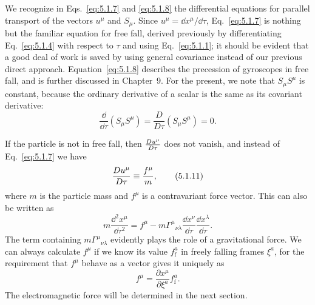 We recognize in Eqs.~\eqref{eq:5.1.7} and \eqref{eq:5.1.8} the differential
equations for parallel transport of the vectors \(u^\mu\) and \(S_\mu\).
Since \(u^\mu=\dd x^\mu/\dd\tau\), Eq.~\eqref{eq:5.1.7} is nothing but the
familiar equation for free fall, derived previously by differentiating
Eq.~\eqref{eq:5.1.4} with respect to \(\tau\) and using
Eq.~\eqref{eq:5.1.1}; it should be evident that a good deal of work is saved
by using general covariance instead of our previous direct approach.
Equation~\eqref{eq:5.1.8} describes the precession of gyroscopes in free
fall, and is further discussed in Chapter~9. For the present, we note that
\(S_\mu S^\mu\) is constant, because the ordinary derivative of a scalar is
the same as its covariant derivative:
\begin{equation}
  \frac{\dd}{\dd\tau}\left(S_\mu S^\mu\right)
  =
  \frac{D}{D\tau}\left(S_\mu S^\mu\right)
  =0.
  \tag{5.1.10}\label{eq:5.1.10}
\end{equation}

If the particle is not in free fall, then \(\frac{D u^\mu}{D\tau}\) does not
vanish, and instead of Eq.~\eqref{eq:5.1.7} we have
\begin{equation}
  \frac{D u^\mu}{D\tau}
  \equiv
  \frac{f^\mu}{m},
  \tag{5.1.11}\label{eq:5.1.11}
\end{equation}
where \(m\) is the particle mass and \(f^\mu\) is a contravariant force
vector. This can also be written as
\[
  m\frac{\dd^2x^\mu}{\dd\tau^2}
  =
  f^\mu
  -
  m\Gamma^\mu{}_{\nu\lambda}
  \frac{\dd x^\nu}{\dd\tau}
  \frac{\dd x^\lambda}{\dd\tau}.
\]
The term containing \(m\Gamma^\mu{}_{\nu\lambda}\) evidently plays the role
of a gravitational force. We can always calculate \(f^\mu\) if we know its
value \(f_{\mathrm f}^a\) in freely falling frames \(\xi^a\), for the
requirement that \(f^\mu\) behave as a vector gives it uniquely as
\begin{equation}
  f^\mu
  =
  \frac{\partial x^\mu}{\partial\xi^a}f_{\mathrm f}^a.
  \tag{5.1.12}\label{eq:5.1.12}
\end{equation}
The electromagnetic force will be determined in the next section.


